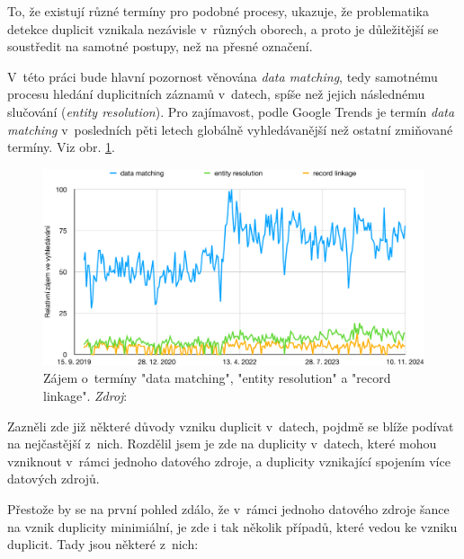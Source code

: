 To, že existují různé termíny pro podobné procesy, ukazuje, že problematika detekce duplicit vznikala nezávisle v~různých oborech, a proto je důležitější se soustředit na samotné postupy, než na přesné označení. \cite{christen_data_2012}

V~této práci bude hlavní pozornost věnována \textit{data matching}, tedy samotnému procesu hledání duplicitních záznamů v~datech, spíše než jejich následnému slučování (\textit{entity resolution}). Pro zajímavost, podle Google Trends je termín \textit{data matching} v~posledních pěti letech globálně vyhledávanější než ostatní zmiňované termíny. Viz obr. \ref{fig:google-trends}.


\begin{figure}[htb]
  \centering
  \includegraphics[scale=0.6]{images/google-trends.pdf}
  \caption{Zájem o~termíny "data matching", "entity resolution" a "record linkage".\newline
    \textit{Zdroj}: \cite{google_trends_google_2024}}
  \label{fig:google-trends}
\end{figure}
\pagebreak

Zazněli zde již některé důvody vzniku duplicit v~datech, pojdmě se blíže podívat na nejčastější z~nich. Rozdělil jsem je zde na duplicity v~datech, které mohou vzniknout v~rámci jednoho datového zdroje, a duplicity vznikající spojením více datových zdrojů.

Přestože by se na první pohled zdálo, že v~rámci jednoho datového zdroje šance na vznik duplicity minimiální, je zde i tak několik případů, které vedou ke vzniku duplicit. Tady jsou některé z~nich:

